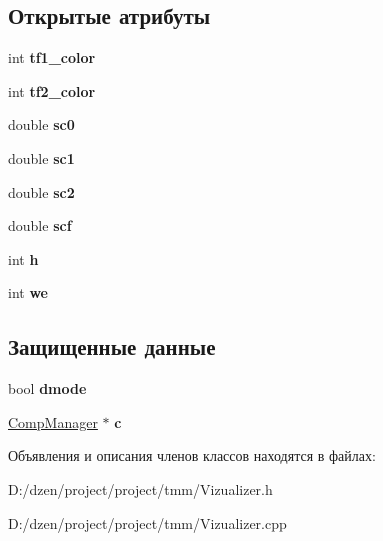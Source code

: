 \subsection*{Открытые атрибуты}
\begin{DoxyCompactItemize}
\item 
\hypertarget{class_vizualizer_a513f0b94560336c0f09916d0ea255526}{
int {\bfseries tf1\_\-color}}
\label{class_vizualizer_a513f0b94560336c0f09916d0ea255526}

\item 
\hypertarget{class_vizualizer_a6085fc9858b4b6682af42df58213a6e8}{
int {\bfseries tf2\_\-color}}
\label{class_vizualizer_a6085fc9858b4b6682af42df58213a6e8}

\item 
\hypertarget{class_vizualizer_aa648e78a187c50486cc06822b94b8844}{
double {\bfseries sc0}}
\label{class_vizualizer_aa648e78a187c50486cc06822b94b8844}

\item 
\hypertarget{class_vizualizer_a7f6c2c2d2a691838b2d53f59fa69add1}{
double {\bfseries sc1}}
\label{class_vizualizer_a7f6c2c2d2a691838b2d53f59fa69add1}

\item 
\hypertarget{class_vizualizer_af18035043aef2b5bd3309d337ea0ffb9}{
double {\bfseries sc2}}
\label{class_vizualizer_af18035043aef2b5bd3309d337ea0ffb9}

\item 
\hypertarget{class_vizualizer_abdd02ec7cc533819f044bb77cef2188f}{
double {\bfseries scf}}
\label{class_vizualizer_abdd02ec7cc533819f044bb77cef2188f}

\item 
\hypertarget{class_vizualizer_a945b64c2c201cdbb28410d27b6db7396}{
int {\bfseries h}}
\label{class_vizualizer_a945b64c2c201cdbb28410d27b6db7396}

\item 
\hypertarget{class_vizualizer_ac2596ac33c1bdfc1c58137fd04c6a474}{
int {\bfseries we}}
\label{class_vizualizer_ac2596ac33c1bdfc1c58137fd04c6a474}

\end{DoxyCompactItemize}
\subsection*{Защищенные данные}
\begin{DoxyCompactItemize}
\item 
\hypertarget{class_vizualizer_aa878fa391b4be64bba236b2dd27c0c2e}{
bool {\bfseries dmode}}
\label{class_vizualizer_aa878fa391b4be64bba236b2dd27c0c2e}

\item 
\hypertarget{class_vizualizer_a110fa89a93563634fabb8a68c1e9003c}{
\hyperlink{class_comp_manager}{CompManager} $\ast$ {\bfseries c}}
\label{class_vizualizer_a110fa89a93563634fabb8a68c1e9003c}

\end{DoxyCompactItemize}


Объявления и описания членов классов находятся в файлах:\begin{DoxyCompactItemize}
\item 
D:/dzen/project/project/tmm/Vizualizer.h\item 
D:/dzen/project/project/tmm/Vizualizer.cpp\end{DoxyCompactItemize}
